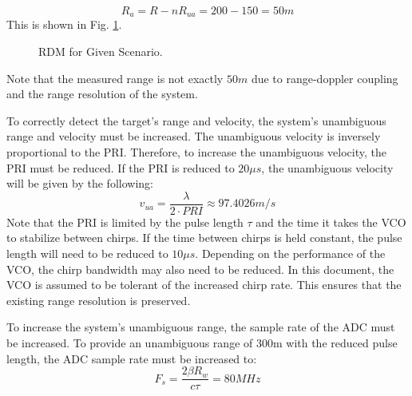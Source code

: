 \documentclass[conference]{IEEEtran}
\begin{document}
\begin{equation}
R_a = R - nR_{ua} = 200 - 150 = 50m
\end{equation}
This is shown in Fig. \ref{RDM3}.
\begin{figure}[H]
\centerline{}
\caption{RDM for Given Scenario.}
\label{RDM3}
\end{figure}
\noindent
Note that the measured range is not exactly $50m$ due to range-doppler coupling and the range resolution of the system.
\par
To correctly detect the target's range and velocity, the system's unambiguous range and velocity must be increased. The unambiguous velocity is inversely proportional to the PRI. Therefore, to increase the unambiguous velocity, the PRI must be reduced. If the PRI is reduced to $20\mu s$, the unambiguous velocity will be given by the following:
\begin{equation}
v_{ua} = \frac{\lambda}{2\cdot PRI} \approx 97.4026 m/s
\end{equation}
Note that the PRI is limited by the pulse length $\tau$ and the time it takes the VCO to stabilize between chirps. If the time between chirps is held constant, the pulse length will need to be reduced to $10\mu s$. Depending on the performance of the VCO, the chirp bandwidth may also need to be reduced. In this document, the VCO is assumed to be tolerant of the increased chirp rate. This ensures that the existing range resolution is preserved.
\par
To increase the system's unambiguous range, the sample rate of the ADC must be increased. To provide an unambiguous range of 300m with the reduced pulse length, the ADC sample rate must be increased to:
\begin{equation}
F_s = \frac{2\beta R_w}{c\tau} = 80MHz 
\end{equation} 
%
%
\end{document}
